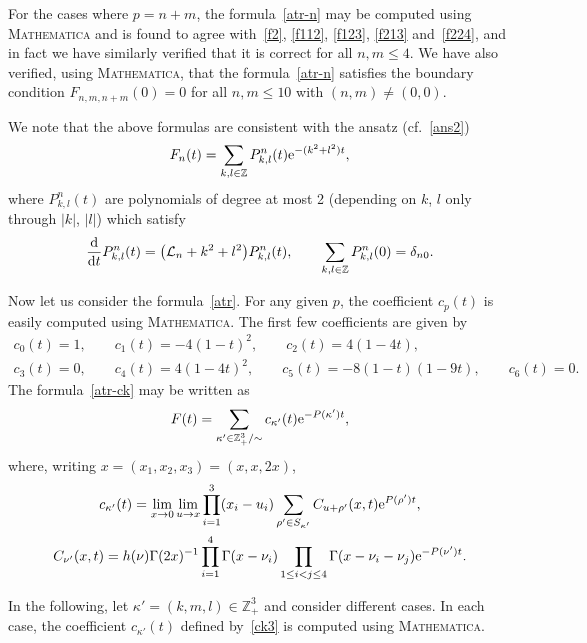 \documentclass[pdftex]{sigma}
\theoremstyle{definition}
\newcommand\Z{{\mathbb Z}}
\newcommand\cL{{\mathcal L}}
\begin{document}
For the cases where $p=n+m$, the formula~\eqref{atr-n} may be computed using \textsc{Mathematica}
and is found to agree with~\eqref{f2}, \eqref{f112}, \eqref{f123}, \eqref{f213} and~\eqref{f224},
and in fact we have similarly verified that it is correct for all $n,m\le 4$. We have also verified,
using \textsc{Mathematica}, that the formula~\eqref{atr-n} satisfies the boundary condition
$F_{n,m,n+m}(0)=0$ for all $n,m\le 10$ with $(n,m)\ne (0,0)$.

We note that the above formulas are consistent with the ansatz (cf.\ \eqref{ans2})
\begin{equation}\label{ans3}
F_n(t)=\sum_{k,l\in\Z} P^n_{k,l}(t) {\rm e}^{-(k^2+l^2)t},
\end{equation}
where $P^n_{k,l}(t)$ are polynomials of degree at most 2 (depending on $k$, $l$ only through $|k|$, $|l|$)
which satisfy
\[\frac{\rm d}{{\rm d}t} P^n_{k,l}(t) = \big(\cL_n+k^2+l^2\big) P^n_{k,l}(t),\qquad \sum_{k,l\in\Z} P^n_{k,l}(0)=\delta_{n0}. \]

Now let us consider the formula~\eqref{atr}. For any given $p$, the coefficient $c_p(t)$ is easily
computed using \textsc{Mathematica}. The first few coefficients are given by
\begin{gather*}
c_0(t)=1,\qquad c_1(t)=-4(1-t)^2,\qquad c_2(t)=4 (1-4t),\\
c_3(t)=0, \qquad c_4(t)=4(1-4t)^2,\qquad c_5(t)=-8(1-t)(1-9t),\qquad c_6(t)=0.\end{gather*}
The formula~\eqref{atr-ck} may be written as
\[F(t)=\sum_{\kappa'\in \Z_+^3/\sim} c_{\kappa'}(t) {\rm e}^{-P(\kappa')t},\]
where, writing $x=(x_1,x_2,x_3)=(x,x,2x)$,
\begin{gather}
c_{\kappa'}(t)= \lim_{x\to 0}\lim_{u\to x} \prod_{i=1}^3 (x_i-u_i)
\sum_{\rho' \in S_{\kappa'}} C_{u+\rho'}(x,t) {\rm e}^{P(\rho')t},\nonumber\\
C_{\nu'}(x,t)= h(\nu) \Gamma(2x)^{-1} \prod_{i=1}^4 \Gamma(x-\nu_i) \prod_{1\le i<j\le 4}\Gamma(x-\nu_i-\nu_j) {\rm e}^{-P(\nu') t}.\label{ck3}
\end{gather}

In the following, let $\kappa'=(k,m,l)\in\Z_+^3$ and consider different cases. In each case, the coefficient $c_{\kappa'}(t)$
defined by~\eqref{ck3} is computed using \textsc{Mathematica}.
\end{document}
